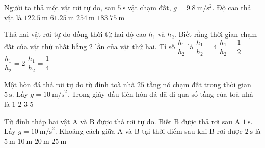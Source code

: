 \begin{ex}
	Người ta thả một vật rơi tự do, sau $\SI{5}{\second}$ vật chạm đất, $g=\SI{9.8}{\meter/\second^2}$. Độ cao thả vật là
	\choice
	{\True $\SI{122.5}{\meter}$}
	{$\SI{61.25}{\meter}$}
	{$\SI{254}{\meter}$}
	{$\SI{183,75}{\meter}$}
\end{ex}

\begin{ex}
	Thả hai vật rơi tự do đồng thời từ hai độ cao $h_1$ và $h_2$. Biết rằng thời gian chạm đất của vật thứ nhất bằng 2 lần của vật thứ hai. Tỉ số $\dfrac{h_1}{h_2}$ là
	\choice
	{\True $\dfrac{h_1}{h_2}=4$}
	{$\dfrac{h_1}{h_2}=\dfrac{1}{2}$}
	{$\dfrac{h_1}{h_2}=2$}
	{$\dfrac{h_1}{h_2}=\dfrac{1}{4}$}
\end{ex}

\begin{ex}
	Một hòn đá thả rơi tự do từ đỉnh toà nhà $25$ tầng nó chạm đất trong thời gian $5\ \text{s}$. Lấy $g=10\ \text{m/s}^2$. Trong giây đầu tiên hòn đá đã đi qua số tầng của toà nhà là
	\choice
	{\True $1$}
	{$2$}
	{$3$}
	{$5$}
\end{ex}

\begin{ex}
	Từ đỉnh tháp hai vật A và B được thả rơi tự do. Biết B được thả rơi sau A $1\ \text{s}$. Lấy $g=10\ \text{m/s}^2$. Khoảng cách giữa A và B tại thời điểm sau khi B rơi được $2\ \text{s}$ là
	\choice
	{$5\ \text{m}$}
	{$10\ \text{m}$}
	{$20\ \text{m}$}
	{\True $25\ \text{m}$}
\end{ex}

